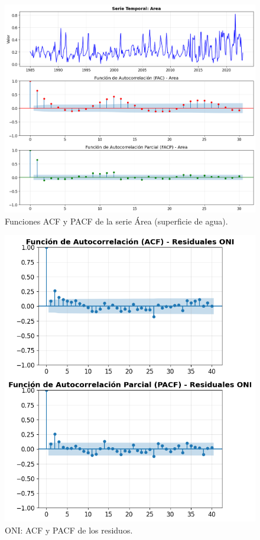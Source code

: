 \begin{figure}[H]
    \centering
    \includegraphics[scale=.42]{Figures/facp_Area.png}
    \caption{Funciones ACF y PACF de la serie Área (superficie de agua).}
    \label{fig:facp_area}
\end{figure}


\begin{figure}[H]\centering
\includegraphics[scale=.52]{Figures/acf_pacf_res_oni.png}
\caption{ONI: ACF y PACF de los residuos.}
\label{fig:acf_pacf_res_oni}
\end{figure}

